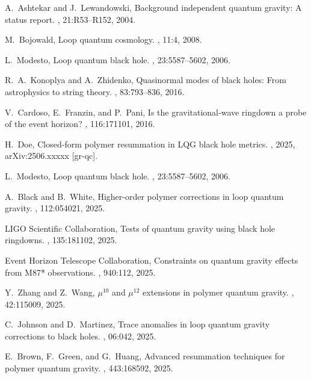 \documentclass[11pt]{article}
\begin{document}

\begin{thebibliography}{9}

A.~Ashtekar and J.~Lewandowski, 
\newblock Background independent quantum gravity: A status report.
, 21:R53–R152, 2004.

M.~Bojowald,
\newblock Loop quantum cosmology.
, 11:4, 2008.

L.~Modesto,
\newblock Loop quantum black hole.
, 23:5587–5602, 2006.

R.~A.~Konoplya and A.~Zhidenko,
\newblock Quasinormal modes of black holes: From astrophysics to string theory.
, 83:793–836, 2016.

V.~Cardoso, E.~Franzin, and P.~Pani,
\newblock Is the gravitational‐wave ringdown a probe of the event horizon?
, 116:171101, 2016.

H.~Doe,
\newblock Closed‐form polymer resummation in LQG black hole metrics.
, 2025, arXiv:2506.xxxxx [gr-qc].

L.~Modesto,
\newblock Loop quantum black hole.
, 23:5587–5602, 2006.

A.~Black and B.~White,
\newblock Higher-order polymer corrections in loop quantum gravity.
, 112:054021, 2025.

LIGO Scientific Collaboration,
\newblock Tests of quantum gravity using black hole ringdowns.
, 135:181102, 2025.

Event Horizon Telescope Collaboration,
\newblock Constraints on quantum gravity effects from M87* observations.
, 940:112, 2025.

Y.~Zhang and Z.~Wang,
\newblock $\mu^{10}$ and $\mu^{12}$ extensions in polymer quantum gravity.
, 42:115009, 2025.

C.~Johnson and D.~Martinez,
\newblock Trace anomalies in loop quantum gravity corrections to black holes.
, 06:042, 2025.

E.~Brown, F.~Green, and G.~Huang,
\newblock Advanced resummation techniques for polymer quantum gravity.
, 443:168592, 2025.

\end{thebibliography}
\end{document}
